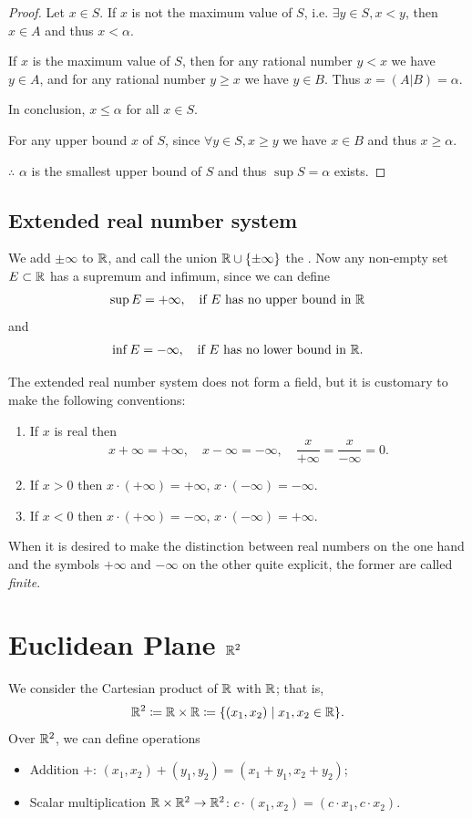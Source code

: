 \begin{proof}
Let $x \in S$. 
If $x$ is not the maximum value of $S$, i.e. $\exists y \in S,x<y$, then $x \in A$ and thus $x<\alpha$.

If $x$ is the maximum value of $S$, then for any rational number $y<x$ we have $y \in A$, and for any rational number $y \ge x$ we have $y \in B$.
Thus $x=(A|B)=\alpha$.

In conclusion, $x \le \alpha$ for all $x \in S$.

For any upper bound $x$ of $S$, since $\forall y \in S, x \ge y$ we have $x \in B$ and thus $x \ge \alpha$.

$\therefore$ $\alpha$ is the smallest upper bound of $S$ and thus $\sup S = \alpha$ exists.
\end{proof}

\subsection{Extended real number system}
\begin{definition}
We add $\pm\infty$ to $\mathbb R$, and call the union $\mathbb R\cup\{\pm\infty\}$ the . Now any non-empty set $E\subset\mathbb R$ has a supremum and infimum, since we can define
\[\sup E=+\infty,\quad\text{if $E$ has no upper bound in $\mathbb R$}\]
and
\[\inf E=-\infty,\quad\text{if $E$ has no lower bound in $\mathbb R$.}\]
\end{definition}

The extended real number system does not form a field, but it is customary to make the following conventions:
\begin{enumerate}[label=(\arabic*)]
\item If $x$ is real then
\[ x+\infty=+\infty, \quad x-\infty=-\infty, \quad \frac{x}{+\infty}=\frac{x}{-\infty}=0. \]
\item If $x>0$ then $x\cdot(+\infty)=+\infty$, $x\cdot(-\infty)=-\infty$.
\item If $x<0$ then $x\cdot(+\infty)=-\infty$, $x\cdot(-\infty)=+\infty$.
\end{enumerate}
When it is desired to make the distinction between real numbers on the one hand and the symbols $+\infty$ and $-\infty$ on the other quite explicit, the former are called \emph{finite}.
\pagebreak

\section{Euclidean Plane $\mathbb R^2$}
We consider the Cartesian product of $\mathbb R$ with $\mathbb R$; that is,
\[ \mathbb R^2\coloneqq\mathbb R\times\mathbb R\coloneqq\{(x_1,x_2)\mid x_1,x_2\in\mathbb R\}. \]
Over $\mathbb R^2$, we can define operations
\begin{itemize}
\item Addition $+$: $(x_1,x_2)+(y_1,y_2)=(x_1+y_1,x_2+y_2)$;
\item Scalar multiplication $\mathbb R\times\mathbb R^2\to\mathbb R^2$: $c\cdot(x_1,x_2)=(c\cdot x_1,c\cdot x_2)$.
\end{itemize}

